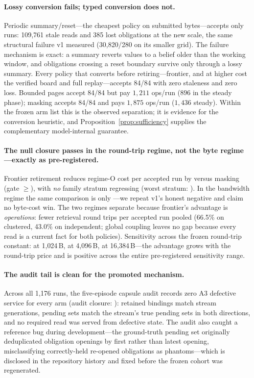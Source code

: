 \paragraph{Lossy conversion fails; typed conversion does not.}
Periodic summary/reset---the cheapest
policy on submitted bytes---accepts only \RetwoSummaryResetAccepted{}
runs: 109{,}761 stale reads and 385 lost obligations at the new scale,
the same structural failure v1 measured (30{,}820/280 on its smaller
grid). The failure mechanism is exact: a summary reverts values to a
belief older than the working window, and obligations crossing a reset
boundary survive only through a lossy summary. Every policy that
converts before retiring---frontier, and at higher cost the verified
board and full replay---accepts 84/84 with zero staleness and zero
loss. Bounded pages accept 84/84 but pay $1{,}211$ ops/run
($896$ in the steady phase); masking accepts 84/84 and pays $1{,}875$
ops/run ($1{,}436$ steady). Within the frozen arm list this is the
observed separation; it is evidence for the conversion heuristic, and
Proposition~\ref{prop:sufficiency} supplies the complementary
model-internal guarantee.

\paragraph{The null closure passes in the round-trip regime, not the
byte regime---exactly as pre-registered.} Frontier retirement reduces
regime-O cost per accepted run by \RetwoNullReduction{} versus masking
(gate $\ge$\RetwoNullThreshold{}), with \emph{no} family stratum
regressing (worst stratum: \RetwoWorstFamily). In the bandwidth regime
the same comparison is only \RetwoBytesWin{}---we repeat v1's honest
negative and claim no byte-cost win. The two regimes separate because
frontier's advantage is \emph{operations}: \RetwoOpsReduction{} fewer
retrieval round trips per accepted run pooled
(66.5\% on clustered, 43.0\% on
independent; global coupling leaves no gap because every read is a
current fact for both policies). Sensitivity across the frozen
round-trip constant: \RetwoSensK{} at 1{,}024\,B, \RetwoSensM{} at
4{,}096\,B, \RetwoSensXxl{} at 16{,}384\,B---the advantage grows with
the round-trip price and is positive across the entire pre-registered
sensitivity range.

\paragraph{The audit tail is clean for the promoted mechanism.} Across
all 1{,}176 runs, the five-episode capsule audit records zero A3
defective service for every arm (audit closure:
\RetwoAuditClosure{}): retained bindings match stream generations,
pending sets match the stream's true pending sets in both directions,
and no required read was served from defective state. The audit also
caught a reference bug during development---the ground-truth pending
set originally deduplicated obligation openings by first rather than
latest opening, misclassifying correctly-held re-opened obligations as
phantoms---which is disclosed in the repository history and fixed
before the frozen cohort was regenerated.

